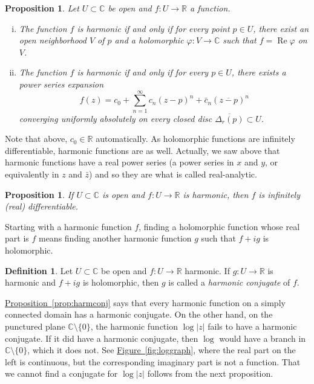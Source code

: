 \documentclass[12pt,openany]{book}
\renewcommand{\Re}{\operatorname{Re}}
\newcommand{\sabs}[1]{\lvert {#1} \rvert}
\newcommand{\C}{{\mathbb{C}}}
\newcommand{\R}{{\mathbb{R}}}
\newcommand{\myindex}[1]{#1\index{#1}}
\theoremstyle{plain}
\newtheorem{prop}[thm]{Proposition}
\theoremstyle{remark}
\theoremstyle{definition}
\newtheorem{defn}[thm]{Definition}
\theoremstyle{exercise}
\theoremstyle{example}
\newcommand{\figureref}[1]{\hyperref[#1]{Figure~\ref*{#1}}}
\newcommand{\propref}[1]{\hyperref[#1]{Proposition~\ref*{#1}}}
\begin{document}
\begin{prop} \label{prop:harmanal}
Let $U \subset \C$ be open and $f \colon U \to \R$ a function.
\begin{enumerate}[(i)]
\item
The function $f$ is harmonic if and only if
for every point $p \in U$, there exist an open neighborhood $V$ of $p$ and a
holomorphic $\varphi \colon V \to \C$ such that $f = \Re \varphi$
on $V$.
\item
The function $f$ is harmonic if and only if
for every $p \in U$, there exists a power series expansion
\begin{equation*}
f(z) =
c_0
+
\sum_{n=1}^\infty c_n {(z-p)}^n + \bar{c}_n {(\overline{z-p})}^n
\end{equation*}
converging uniformly absolutely
on every closed disc $\overline{\Delta_r(p)} \subset U$.
\end{enumerate}
\end{prop}

Note that above, $c_0 \in \R$ automatically.
As holomorphic functions are
infinitely differentiable, harmonic functions are as well.
Actually, we saw above that harmonic functions have a real power series
(a power series in $x$ and $y$, or equivalently in $z$ and $\bar{z}$)
and so they are what is called real-analytic.

\begin{prop}
If $U \subset \C$ is open and $f \colon U \to \R$ is harmonic, then $f$ is infinitely (real) differentiable.
\end{prop}

Starting with a harmonic function $f$, finding a holomorphic function whose
real part is $f$ means finding another harmonic function $g$ such that $f+ig$ is
holomorphic.

\begin{defn}
Let $U \subset \C$ be open and $f \colon U \to \R$ harmonic.
If $g \colon U \to \R$ is harmonic and $f + i g$ is holomorphic,
then $g$ is called a \emph{\myindex{harmonic conjugate}} of $f$.
\end{defn}

\propref{prop:harmconj}
says that every harmonic function on a simply connected
domain has a harmonic conjugate.  On the other hand, on the punctured plane
$\C \setminus \{ 0 \}$, the harmonic function $\log \sabs{z}$ 
fails to have a harmonic conjugate.  If it did have a harmonic conjugate,
then $\log$ would have a branch in $\C \setminus \{0\}$, which it does not.
See \figureref{fig:loggraph}, where the real part on the left is
continuous, but the corresponding imaginary part is not a function.
That we cannot find a conjugate for $\log \sabs{z}$
follows from the next proposition.
\end{document}
